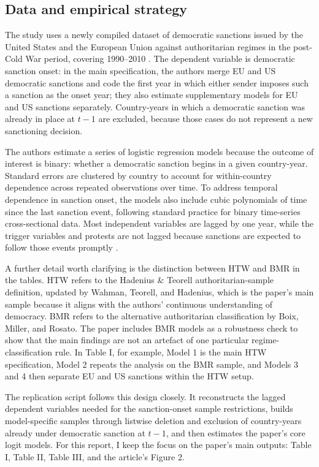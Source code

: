 \documentclass[12pt,letterpaper]{article}
\begin{document}
	\subsection*{Data and empirical strategy}
	
	The study uses a newly compiled dataset of democratic sanctions issued by the United States and the European Union against authoritarian regimes in the post-Cold War period, covering 1990--2010 \citep{vonsoestNotAllDictators2015}. The dependent variable is democratic sanction onset: in the main specification, the authors merge EU and US democratic sanctions and code the first year in which either sender imposes such a sanction as the onset year; they also estimate supplementary models for EU and US sanctions separately. Country-years in which a democratic sanction was already in place at $t-1$ are excluded, because those cases do not represent a new sanctioning decision.
	
	The authors estimate a series of logistic regression models because the outcome of interest is binary: whether a democratic sanction begins in a given country-year. Standard errors are clustered by country to account for within-country dependence across repeated observations over time. To address temporal dependence in sanction onset, the models also include cubic polynomials of time since the last sanction event, following standard practice for binary time-series cross-sectional data. Most independent variables are lagged by one year, while the trigger variables and protests are not lagged because sanctions are expected to follow those events promptly \citep{vonsoestNotAllDictators2015}.
	
	A further detail worth clarifying is the distinction between HTW and BMR in the tables. HTW refers to the Hadenius \& Teorell authoritarian-sample definition, updated by Wahman, Teorell, and Hadenius, which is the paper's main sample because it aligns with the authors' continuous understanding of democracy. BMR refers to the alternative authoritarian classification by Boix, Miller, and Rosato. The paper includes BMR models as a robustness check to show that the main findings are not an artefact of one particular regime-classification rule. In Table I, for example, Model 1 is the main HTW specification, Model 2 repeats the analysis on the BMR sample, and Models 3 and 4 then separate EU and US sanctions within the HTW setup.
	
	The replication script follows this design closely. It reconstructs the lagged dependent variables needed for the sanction-onset sample restrictions, builds model-specific samples through listwise deletion and exclusion of country-years already under democratic sanction at $t-1$, and then estimates the paper's core logit models. For this report, I keep the focus on the paper's main outputs: Table I, Table II, Table III, and the article's Figure 2.	
	
\end{document}
